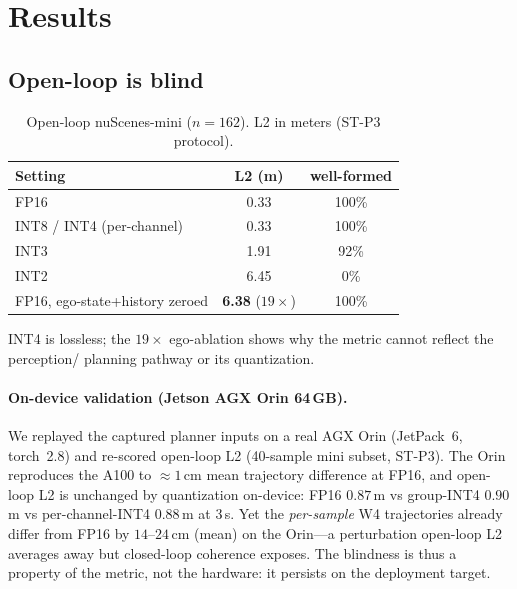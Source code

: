\documentclass[conference]{IEEEtran}
\begin{document}
\section{Results}
\subsection{Open-loop is blind}
\begin{table}[t]\centering
\caption{Open-loop nuScenes-mini ($n{=}162$). L2 in meters (ST-P3 protocol).}
\begin{tabular}{lcc}
\toprule
Setting & L2 (m) & well-formed \\
\midrule
FP16 & 0.33 & 100\% \\
INT8 / INT4 (per-channel) & 0.33 & 100\% \\
INT3 & 1.91 & 92\% \\
INT2 & 6.45 & 0\% \\
FP16, ego-state+history zeroed & \textbf{6.38} ($19\times$) & 100\% \\
\bottomrule
\end{tabular}
\end{table}
INT4 is lossless; the $19\times$ ego-ablation shows why the metric cannot reflect the perception/
planning pathway or its quantization.

\paragraph{On-device validation (Jetson AGX Orin 64\,GB).} We replayed the captured planner inputs
on a real AGX Orin (JetPack~6, torch~2.8) and re-scored open-loop L2 (40-sample mini subset, ST-P3).
The Orin reproduces the A100 to $\approx 1$\,cm mean trajectory difference at FP16, and open-loop L2
is unchanged by quantization on-device: FP16 $0.87$\,m vs group-INT4 $0.90$\,m vs per-channel-INT4
$0.88$\,m at 3\,s. Yet the \emph{per-sample} W4 trajectories already differ from FP16 by $14$--$24$\,cm
(mean) on the Orin---a perturbation open-loop L2 averages away but closed-loop coherence exposes. The
blindness is thus a property of the metric, not the hardware: it persists on the deployment target.
\end{document}
